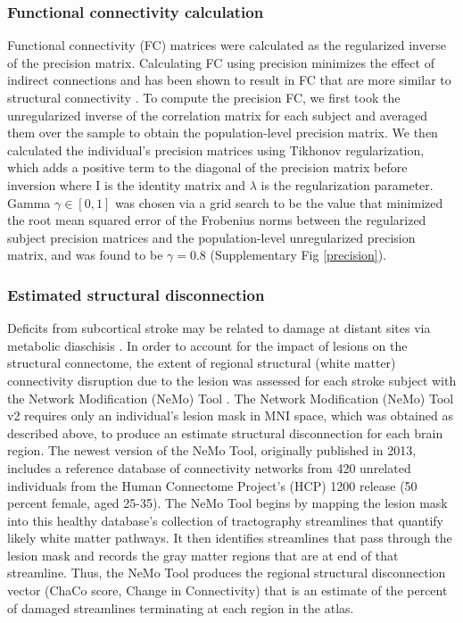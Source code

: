\documentclass[10pt]{article}
\begin{document}
	\subsubsection*{Functional connectivity calculation}
	 Functional connectivity (FC) matrices were calculated as the regularized inverse of the precision matrix. Calculating FC using precision minimizes the effect of indirect connections and has been shown to result in FC that are more similar to structural connectivity \cite{Wodeyar2020-kz, Liegeois2020-ua}. To compute the precision FC, we first took the unregularized inverse of the correlation matrix for each subject and averaged them over the sample to obtain the population-level precision matrix. We then calculated the individual’s precision matrices using Tikhonov regularization, which adds a positive term to the diagonal of the precision matrix before inversion where I is the identity matrix and $ \lambda $ is the regularization parameter. Gamma $\gamma \in [0,1]$ was chosen via a grid search to be the value that minimized the root mean squared error of the Frobenius norms between the regularized subject precision matrices and the population-level unregularized precision matrix, and was found to be $\gamma = 0.8$ (Supplementary Fig \ref{precision}).
	
	\subsubsection*{Estimated structural disconnection}
	Deficits from subcortical stroke may be related to damage at distant sites via metabolic diaschisis \cite{Hillis2002-dz, Corbetta2015-ez}. In order to account for the impact of lesions on the structural connectome, the extent of regional structural (white matter) connectivity disruption due to the lesion was assessed for each stroke subject with the Network Modification (NeMo) Tool \cite{Kuceyeski2013-nk}. The Network Modification (NeMo) Tool v2 requires only an individual’s lesion mask in MNI space, which was obtained as described above, to produce an estimate structural disconnection for each brain region. The newest version of the NeMo Tool, originally published in 2013, includes a reference database of connectivity networks from 420 unrelated individuals from the Human Connectome Project’s (HCP) 1200 release (50 percent female, aged 25-35). The NeMo Tool begins by mapping the lesion mask into this healthy database’s collection of tractography streamlines that quantify likely white matter pathways. It then identifies streamlines that pass through the lesion mask and records the gray matter regions that are at end of that streamline. Thus, the NeMo Tool produces the regional structural disconnection vector (ChaCo score, Change in Connectivity) that is an estimate of the percent of damaged streamlines terminating at each region in the atlas.
	
\end{document}
